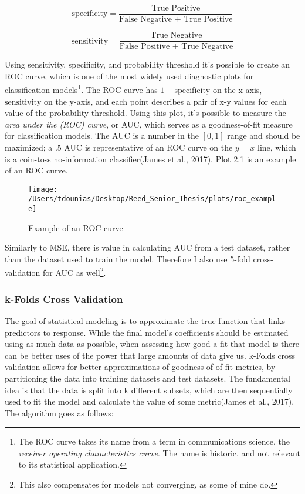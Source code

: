 \documentclass[12pt,twoside]{reedthesis}
\begin{document}
  \[\text{specificity} = \frac{\text{True Positive}}{\text{False Negative + True Positive}}\]
  
  \[\text{sensitivity} = \frac{\text{True Negative}}{\text{False Positive + True Negative}}\]
  
  Using sensitivity, specificity, and probability threshold it's possible
  to create an ROC curve, which is one of the most widely used diagnostic
  plots for classification models\footnote{The ROC curve takes its name
    from a term in communications science, the \emph{receiver operating
    characteristics curve}. The name is historic, and not relevant to its
    statistical application.}. The ROC curve has \(1-\text{specificity}\)
  on the x-axis, \(\text{sensitivity}\) on the y-axis, and each point
  describes a pair of x-y values for each value of the probability
  threshold. Using this plot, it's possible to measure the \emph{area
  under the (ROC) curve}, or AUC, which serves as a goodness-of-fit
  measure for classification models. The AUC is a number in the \([0,1]\)
  range and should be maximized; a \(.5\) AUC is representative of an ROC
  curve on the \(y = x\) line, which is a coin-toss no-information
  classifier(James et al., 2017). Plot 2.1 is an example of an ROC curve.
  
  \begin{figure}
  
  {\centering \texttt{[image: /Users/tdounias/Desktop/Reed\_Senior\_Thesis/plots/roc\_example]} 
  
  }
  
  \caption[Example of an ROC curve]{Example of an ROC curve}\label{fig:roc example}
  \end{figure}
  
  Similarly to MSE, there is value in calculating AUC from a test dataset,
  rather than the dataset used to train the model. Therefore I also use
  5-fold cross-validation for AUC as well\footnote{This also compensates
    for models not converging, as some of mine do.}.
  
  \subsubsection{k-Folds Cross Validation}\label{k-folds-cross-validation}
  
  The goal of statistical modeling is to approximate the true function
  that links predictors to response. While the final model's coefficients
  should be estimated using as much data as possible, when assessing how
  good a fit that model is there can be better uses of the power that
  large amounts of data give us. k-Folds cross validation allows for
  better approximations of goodness-of-of-fit metrics, by partitioning the
  data into training datasets and test datasets. The fundamental idea is
  that the data is split into k different subsets, which are then
  sequentially used to fit the model and calculate the value of some
  metric(James et al., 2017). The algorithm goes as follows:
  
\end{document}
